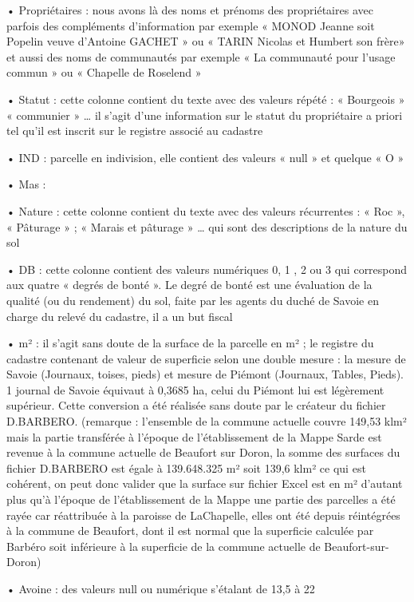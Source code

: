 •	Propriétaires : nous avons là des noms et prénoms des propriétaires avec parfois des compléments d’information par exemple « MONOD Jeanne soit Popelin veuve d'Antoine GACHET » ou « TARIN Nicolas et Humbert son frère» et aussi des noms de communautés par exemple « La communauté pour l'usage commun » ou « Chapelle de Roselend »

•	Statut : cette colonne contient du texte avec des valeurs répété : « Bourgeois » « communier » … il s’agit d’une information sur le statut du propriétaire a priori tel qu’il est inscrit sur le registre associé au cadastre

•	IND : parcelle en indivision, elle contient des valeurs « null » et quelque « O »

•	Mas : 

•	Nature : cette colonne contient du texte avec des valeurs récurrentes : « Roc », « Pâturage » ; « Marais et pâturage » … qui sont des descriptions de la nature du sol

•	DB : cette colonne contient des valeurs numériques 0, 1 , 2 ou 3 qui correspond aux quatre « degrés de bonté ». Le degré de bonté est une évaluation de la qualité (ou du rendement) du sol, faite par les agents du duché de Savoie en charge du relevé du cadastre, il a un but fiscal

•	m² : il s’agit sans doute de la surface de la parcelle en m² ; le registre du cadastre contenant de valeur de superficie selon une double mesure : la mesure de Savoie (Journaux, toises, pieds) et mesure de Piémont (Journaux, Tables, Pieds). 1 journal de Savoie équivaut à 0,3685 ha, celui du Piémont lui est légèrement supérieur. Cette conversion a été réalisée sans doute par le créateur du fichier D.BARBERO. (remarque : l’ensemble de la commune actuelle couvre 149,53 klm²  mais la partie transférée à l’époque de l’établissement de la Mappe Sarde est revenue à la commune actuelle de Beaufort sur Doron, la somme des surfaces du fichier D.BARBERO est égale à 139.648.325 m² soit 139,6 klm² ce qui est cohérent, on peut donc valider que la surface sur fichier Excel est en m² d'autant plus qu'à l'époque de l'établissement de la Mappe une partie des parcelles a été rayée car réattribuée à la paroisse de LaChapelle, elles ont été depuis réintégrées à la commune de Beaufort, dont il est normal que la superficie calculée par Barbéro soit inférieure à la superficie de la commune actuelle de Beaufort-sur-Doron) 

•	Avoine : des valeurs null ou numérique s’étalant de 13,5 à 22

